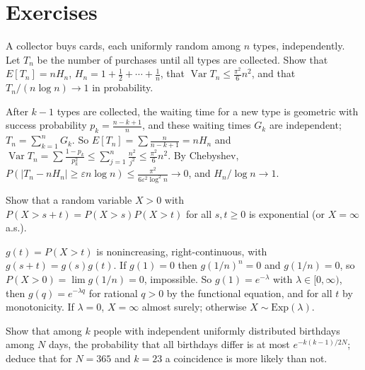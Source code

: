 \section{Exercises}\label{probability:section-exercises}

\begin{exercise}\label{probability:exercise-coupon-collector}
A collector buys cards, each uniformly random among $n$ types, independently. Let $T_n$ be the number of purchases until all types are collected. Show that $E[T_n] = nH_n$, $H_n = 1 + \frac12 + \cdots + \frac1n$, that
$\operatorname{Var}T_n \leq \frac{\pi^2}{6}n^2$, and that $T_n/(n\log n) \to 1$ in probability.
\end{exercise}

\begin{solution}
After $k - 1$ types are collected, the waiting time for a new type is geometric with success probability $p_k = \frac{n - k + 1}{n}$, and these waiting times $G_k$ are independent; $T_n = \sum_{k=1}^nG_k$. So
$E[T_n] = \sum\frac{n}{n - k + 1} = nH_n$ and $\operatorname{Var}T_n = \sum\frac{1 - p_k}{p_k^2} \leq \sum_{j=1}^n\frac{n^2}{j^2} \leq \frac{\pi^2}{6}n^2$. By Chebyshev, $P(|T_n - nH_n| \geq \varepsilon n\log n) \leq \frac{\pi^2}{6\varepsilon^2\log^2n} \to 0$, and
$H_n/\log n \to 1$.
\end{solution}

\begin{exercise}\label{probability:exercise-memoryless}
Show that a random variable $X > 0$ with $P(X > s + t) = P(X > s)P(X > t)$ for all $s, t \geq 0$ is exponential (or $X = \infty$ a.s.).
\end{exercise}

\begin{solution}
$g(t) = P(X > t)$ is nonincreasing, right-continuous, with $g(s + t) = g(s)g(t)$. If $g(1) = 0$ then $g(1/n)^n = 0$ and $g(1/n) = 0$, so $P(X > 0) = \lim g(1/n) = 0$, impossible. So $g(1) = e^{-\lambda}$ with $\lambda \in [0, \infty)$, then
$g(q) = e^{-\lambda q}$ for rational $q > 0$ by the functional equation, and for all $t$ by monotonicity. If $\lambda = 0$, $X = \infty$ almost surely; otherwise $X \sim \mathrm{Exp}(\lambda)$.
\end{solution}

\begin{exercise}\label{probability:exercise-birthday}
Show that among $k$ people with independent uniformly distributed birthdays among $N$ days, the probability that all birthdays differ is at most $e^{-k(k-1)/2N}$; deduce that for $N = 365$ and $k = 23$ a coincidence is more likely
than not.
\end{exercise}

